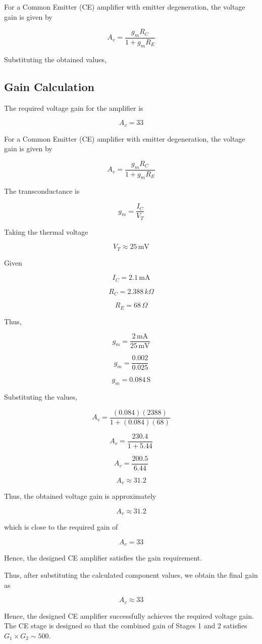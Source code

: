 \documentclass[10pt,twocolumn]{article}
\begin{document}
For a Common Emitter (CE) amplifier with emitter degeneration, the voltage gain is given by

\[
A_v = \frac{g_m R_C}{1 + g_m R_E}
\]

Substituting the obtained values,
\subsection{Gain Calculation}

The required voltage gain for the amplifier is

\[
A_v = 33
\]

For a Common Emitter (CE) amplifier with emitter degeneration, the voltage gain is given by

\[
A_v = \frac{g_m R_C}{1 + g_m R_E}
\]

The transconductance is

\[
g_m = \frac{I_C}{V_T}
\]

Taking the thermal voltage

\[
V_T \approx 25\,\text{mV}
\]

Given

\[
I_C = 2.1\,\text{mA}
\]

\[
R_C = 2.388\,k\Omega
\]

\[
R_E = 68\,\Omega
\]

Thus,

\[
g_m = \frac{2\,\text{mA}}{25\,\text{mV}}
\]

\[
g_m = \frac{0.002}{0.025}
\]

\[
g_m = 0.084\,\text{S}
\]

Substituting the values,

\[
A_v =
\frac{(0.084)(2388)}
{1 + (0.084)(68)}
\]

\[
A_v =
\frac{230.4}{1 + 5.44}
\]

\[
A_v =
\frac{200.5}{6.44}
\]

\[
A_v \approx 31.2
\]

Thus, the obtained voltage gain is approximately

\[
A_v \approx 31.2
\]

which is close to the required gain of

\[
A_v = 33
\]

Hence, the designed CE amplifier satisfies the gain requirement.

Thus, after substituting the calculated component values, we obtain the final gain as

\[
A_v \approx 33
\]

Hence, the designed CE amplifier successfully achieves the required voltage gain.
The CE stage is designed so that the combined gain of Stages 1 and 2 satisfies $G_1 \times G_2 \sim 500$.
\end{document}
